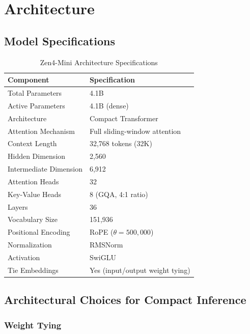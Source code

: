 \documentclass[11pt,a4paper]{article}
\begin{document}
\section{Architecture}

\subsection{Model Specifications}

\begin{table}[H]
\centering
\begin{tabular}{ll}
\toprule
\textbf{Component} & \textbf{Specification} \\
\midrule
Total Parameters         & 4.1B \\
Active Parameters        & 4.1B (dense) \\
Architecture             & Compact Transformer \\
Attention Mechanism      & Full sliding-window attention \\
Context Length           & 32,768 tokens (32K) \\
Hidden Dimension         & 2,560 \\
Intermediate Dimension   & 6,912 \\
Attention Heads          & 32 \\
Key-Value Heads          & 8 (GQA, 4:1 ratio) \\
Layers                   & 36 \\
Vocabulary Size          & 151,936 \\
Positional Encoding      & RoPE ($\theta = 500{,}000$) \\
Normalization            & RMSNorm \\
Activation               & SwiGLU \\
Tie Embeddings           & Yes (input/output weight tying) \\
\bottomrule
\end{tabular}
\caption{Zen4-Mini Architecture Specifications}
\end{table}

\subsection{Architectural Choices for Compact Inference}

\subsubsection{Weight Tying}
\end{document}
